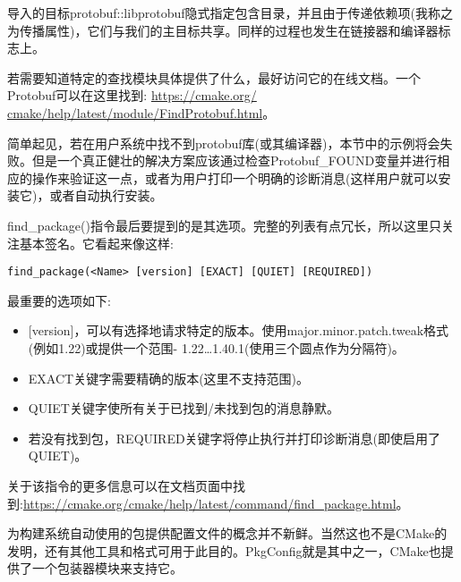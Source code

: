 导入的目标protobuf::libprotobuf隐式指定包含目录，并且由于传递依赖项(我称之为传播属性)，它们与我们的主目标共享。同样的过程也发生在链接器和编译器标志上。

若需要知道特定的查找模块具体提供了什么，最好访问它的在线文档。一个Protobuf可以在这里找到: \url{https://cmake.org/ cmake/help/latest/module/FindProtobuf.html}。

\begin{tcolorbox}[colback=blue!5!white,colframe=blue!75!black,title=重要的Note]
简单起见，若在用户系统中找不到protobuf库(或其编译器)，本节中的示例将会失败。但是一个真正健壮的解决方案应该通过检查Protobuf\_FOUND变量并进行相应的操作来验证这一点，或者为用户打印一个明确的诊断消息(这样用户就可以安装它)，或者自动执行安装。
\end{tcolorbox}

find\_package()指令最后要提到的是其选项。完整的列表有点冗长，所以这里只关注基本签名。它看起来像这样:

\begin{lstlisting}[style=styleCMake]
find_package(<Name> [version] [EXACT] [QUIET] [REQUIRED])
\end{lstlisting}

最重要的选项如下:

\begin{itemize}
\item 
{}[version]，可以有选择地请求特定的版本。使用major.minor.patch.tweak格式(例如1.22)或提供一个范围- 1.22…1.40.1(使用三个圆点作为分隔符)。

\item 
EXACT关键字需要精确的版本(这里不支持范围)。

\item 
QUIET关键字使所有关于已找到/未找到包的消息静默。

\item 
若没有找到包，REQUIRED关键字将停止执行并打印诊断消息(即使启用了QUIET)。
\end{itemize}

关于该指令的更多信息可以在文档页面中找到:\url{https://cmake.org/cmake/help/latest/command/find_package.html}。

为构建系统自动使用的包提供配置文件的概念并不新鲜。当然这也不是CMake的发明，还有其他工具和格式可用于此目的。PkgConfig就是其中之一，CMake也提供了一个包装器模块来支持它。





